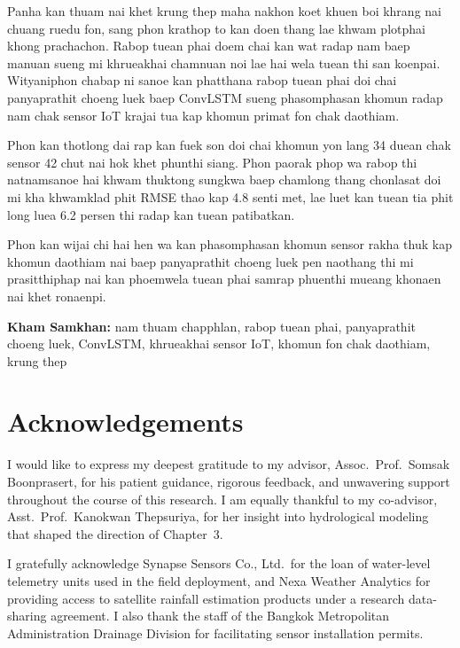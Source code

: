 \documentclass[12pt,a4paper]{report}
\begin{document}
\vspace{0.4cm}
\noindent
Panha kan thuam nai khet krung thep maha nakhon koet khuen boi khrang nai chuang ruedu fon, sang phon krathop to kan doen thang lae khwam plotphai khong prachachon. Rabop tuean phai doem chai kan wat radap nam baep manuan sueng mi khrueakhai chamnuan noi lae hai wela tuean thi san koenpai. Wityaniphon chabap ni sanoe kan phatthana rabop tuean phai doi chai panyaprathit choeng luek baep ConvLSTM sueng phasomphasan khomun radap nam chak sensor IoT krajai tua kap khomun primat fon chak daothiam.

\noindent
Phon kan thotlong dai rap kan fuek son doi chai khomun yon lang 34 duean chak sensor 42 chut nai hok khet phunthi siang. Phon paorak phop wa rabop thi natnamsanoe hai khwam thuktong sungkwa baep chamlong thang chonlasat doi mi kha khwamklad phit RMSE thao kap 4.8 senti met, lae luet kan tuean tia phit long luea 6.2 persen thi radap kan tuean patibatkan.

\noindent
Phon kan wijai chi hai hen wa kan phasomphasan khomun sensor rakha thuk kap khomun daothiam nai baep panyaprathit choeng luek pen naothang thi mi prasitthiphap nai kan phoemwela tuean phai samrap phuenthi mueang khonaen nai khet ronaenpi.

\vspace{0.4cm}
\noindent\textbf{Kham Samkhan:} nam thuam chapphlan, rabop tuean phai, panyaprathit choeng luek, ConvLSTM, khrueakhai sensor IoT, khomun fon chak daothiam, krung thep

\chapter*{Acknowledgements}

\noindent
I would like to express my deepest gratitude to my advisor, Assoc.\ Prof.\ Somsak Boonprasert, for his patient guidance, rigorous feedback, and unwavering support throughout the course of this research. I am equally thankful to my co-advisor, Asst.\ Prof.\ Kanokwan Thepsuriya, for her insight into hydrological modeling that shaped the direction of Chapter~3.

\noindent
I gratefully acknowledge Synapse Sensors Co., Ltd.\ for the loan of water-level telemetry units used in the field deployment, and Nexa Weather Analytics for providing access to satellite rainfall estimation products under a research data-sharing agreement. I also thank the staff of the Bangkok Metropolitan Administration Drainage Division for facilitating sensor installation permits.
\end{document}
